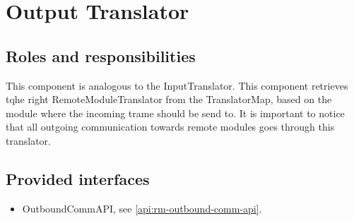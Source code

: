 \section{Output Translator}
\label{element:rm-output-translator}

\subsection{Roles and responsibilities}

\npar This component is analogous to the InputTranslator. This
component retrieves tqhe right RemoteModuleTranslator from the TranslatorMap,
based on the module where the incoming trame should be send to. It is important to notice
that all outgoing communication towards remote modules goes through this
translator.

\subsection{Provided interfaces}

\begin{itemize}
  \item OutboundCommAPI, see \ref{api:rm-outbound-comm-api}.
\end{itemize}